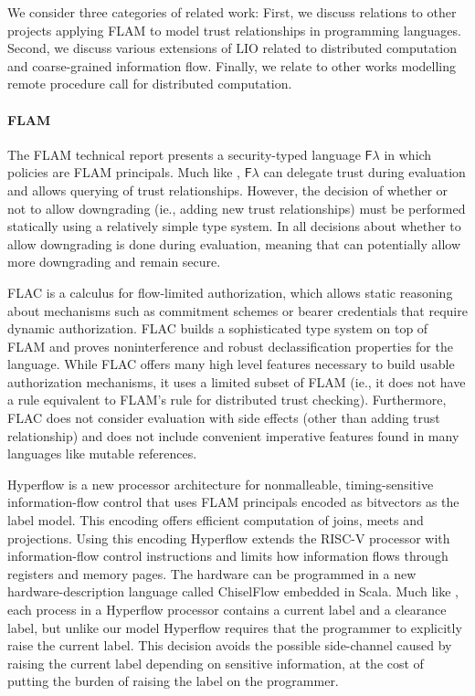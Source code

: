 We consider three categories of related work: First, we discuss relations to other projects applying FLAM to model trust relationships in programming languages. Second, we discuss various extensions of LIO related to distributed computation and coarse-grained information flow. Finally, we relate \lang{} to other works modelling remote procedure call for distributed computation.

\paragraph{FLAM}
The FLAM technical report \cite{flamtr} presents a security-typed language $\mathsf{F}\lambda$ in which policies are FLAM principals. Much like \lang{}, $\mathsf{F}\lambda$ can delegate trust during evaluation and allows querying of trust relationships. However, the decision of whether or not to allow downgrading (ie., adding new trust relationships) must be performed statically using a relatively simple type system. In \lang{} all decisions about whether to allow downgrading is done during evaluation, meaning that \lang{} can potentially allow more downgrading and remain secure.

FLAC \cite{7536372} is a calculus for flow-limited authorization, which allows static reasoning about mechanisms such as commitment schemes or bearer credentials that require dynamic authorization. FLAC builds a sophisticated type system on top of FLAM and proves noninterference and robust declassification properties for the language. While FLAC offers many high level features necessary to build usable authorization mechanisms, it uses a limited subset of FLAM (ie., it does not have a rule equivalent to FLAM's  rule for distributed trust checking). Furthermore, FLAC does not consider evaluation with side effects (other than adding trust relationship) and does not include convenient imperative features found in many languages like mutable references.

Hyperflow \cite{hyperflow} is a new processor architecture for nonmalleable, timing-sensitive information-flow control that uses FLAM principals encoded as bitvectors as the label model. This encoding offers efficient computation of joins, meets and projections. Using this encoding Hyperflow extends the RISC-V processor with information-flow control instructions and limits how information flows through registers and memory pages. The hardware can be programmed in a new hardware-description language called ChiselFlow embedded in Scala. Much like \lang{}, each process in a Hyperflow processor contains a current label and a clearance label, but unlike our model Hyperflow requires that the programmer to explicitly raise the current label. This decision avoids the possible side-channel caused by raising the current label depending on sensitive information, at the cost of putting the burden of raising the label on the programmer.

